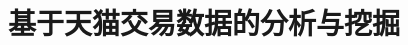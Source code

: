 \documentclass{acm_proc_article-sp}
\newcommand{\hei}{\CJKfamily{hei}}
\newcommand{\xiaoerhao}{\fontsize{18pt}{\baselineskip}\selectfont}
\newcommand{\zap}[1]{}
\begin{document}
\begin{spacing}{1.2}
\title{\xiaoerhao\hei 基于天猫交易数据的分析与挖掘}
\zap{
\subtitle{[Extended Abstract]
\titlenote{A full version of this paper is available as
\textit{Author's Guide to Preparing ACM SIG Proceedings Using
\LaTeX$2_\epsilon$\ and BibTeX} at
\texttt{www.acm.org/eaddress.htm}}}
}
%
%
%
%
%


\end{spacing}
\end{document}
